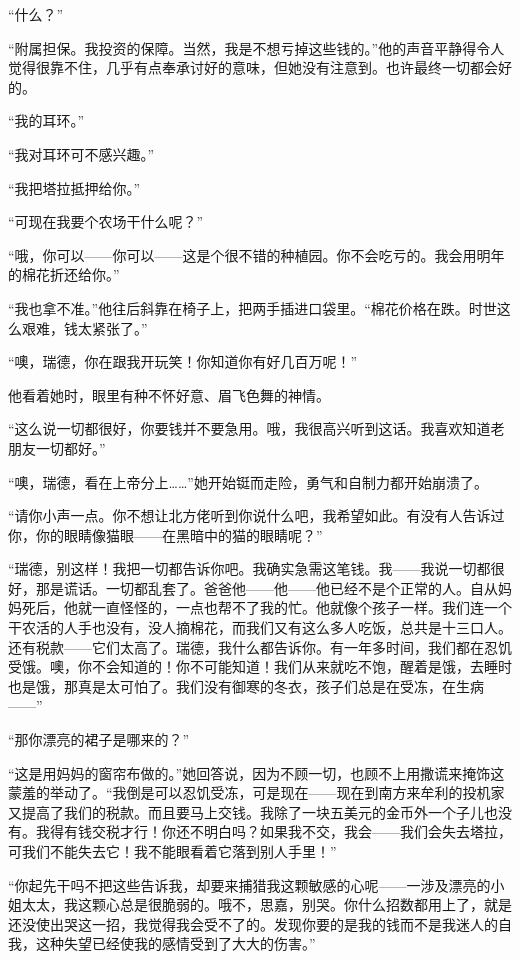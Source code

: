 \par “什么？”
\par “附属担保。我投资的保障。当然，我是不想亏掉这些钱的。”他的声音平静得令人觉得很靠不住，几乎有点奉承讨好的意味，但她没有注意到。也许最终一切都会好的。
\par “我的耳环。”
\par “我对耳环可不感兴趣。”
\par “我把塔拉抵押给你。”
\par “可现在我要个农场干什么呢？”
\par “哦，你可以——你可以——这是个很不错的种植园。你不会吃亏的。我会用明年的棉花折还给你。”
\par “我也拿不准。”他往后斜靠在椅子上，把两手插进口袋里。“棉花价格在跌。时世这么艰难，钱太紧张了。”
\par “噢，瑞德，你在跟我开玩笑！你知道你有好几百万呢！”
\par 他看着她时，眼里有种不怀好意、眉飞色舞的神情。
\par “这么说一切都很好，你要钱并不要急用。哦，我很高兴听到这话。我喜欢知道老朋友一切都好。”
\par “噢，瑞德，看在上帝分上……”她开始铤而走险，勇气和自制力都开始崩溃了。
\par “请你小声一点。你不想让北方佬听到你说什么吧，我希望如此。有没有人告诉过你，你的眼睛像猫眼——在黑暗中的猫的眼睛呢？”
\par “瑞德，别这样！我把一切都告诉你吧。我确实急需这笔钱。我——我说一切都很好，那是谎话。一切都乱套了。爸爸他——他——他已经不是个正常的人。自从妈妈死后，他就一直怪怪的，一点也帮不了我的忙。他就像个孩子一样。我们连一个干农活的人手也没有，没人摘棉花，而我们又有这么多人吃饭，总共是十三口人。还有税款——它们太高了。瑞德，我什么都告诉你。有一年多时间，我们都在忍饥受饿。噢，你不会知道的！你不可能知道！我们从来就吃不饱，醒着是饿，去睡时也是饿，那真是太可怕了。我们没有御寒的冬衣，孩子们总是在受冻，在生病——”
\par “那你漂亮的裙子是哪来的？”
\par “这是用妈妈的窗帘布做的。”她回答说，因为不顾一切，也顾不上用撒谎来掩饰这蒙羞的举动了。“我倒是可以忍饥受冻，可是现在——现在到南方来牟利的投机家又提高了我们的税款。而且要马上交钱。我除了一块五美元的金币外一个子儿也没有。我得有钱交税才行！你还不明白吗？如果我不交，我会——我们会失去塔拉，可我们不能失去它！我不能眼看着它落到别人手里！”
\par “你起先干吗不把这些告诉我，却要来捕猎我这颗敏感的心呢——一涉及漂亮的小姐太太，我这颗心总是很脆弱的。哦不，思嘉，别哭。你什么招数都用上了，就是还没使出哭这一招，我觉得我会受不了的。发现你要的是我的钱而不是我迷人的自我，这种失望已经使我的感情受到了大大的伤害。”
